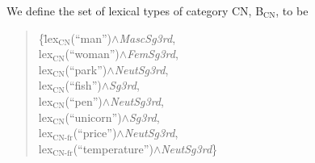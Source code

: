 We define the set of lexical types of category CN,
B$_{\mathrm{CN}}$, to be
\begin{quote}
\begin{tabbing}
\{\=lex$_{\mathrm{CN}}$(``man'')\d{$\wedge$}\textit{MascSg3rd}, \\
  \>lex$_{\mathrm{CN}}$(``woman'')\d{$\wedge$}\textit{FemSg3rd}, \\
  \>lex$_{\mathrm{CN}}$(``park'')\d{$\wedge$}\textit{NeutSg3rd}, \\
  \>lex$_{\mathrm{CN}}$(``fish'')\d{$\wedge$}\textit{Sg3rd}, \\
  \>lex$_{\mathrm{CN}}$(``pen'')\d{$\wedge$}\textit{NeutSg3rd}, \\
  \>lex$_{\mathrm{CN}}$(``unicorn'')\d{$\wedge$}\textit{Sg3rd}, \\
  \>lex$_{\mathrm{CN}\textrm{-}\mathrm{fr}}$(``price'')\d{$\wedge$}\textit{NeutSg3rd}, \\
  \>lex$_{\mathrm{CN}\textrm{-}\mathrm{fr}}$(``temperature'')\d{$\wedge$}\textit{NeutSg3rd}\}
\end{tabbing}
\end{quote}

